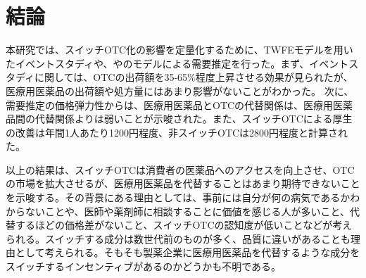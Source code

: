 \documentclass[a4paper,11pt,uplatex]{jsarticle}
\theoremstyle{definition}
\begin{document}
\section{結論}
本研究では、スイッチOTC化の影響を定量化するために、TWFEモデルを用いたイベントスタディや、\cite{Berry1994}や\cite{BLP}のモデルによる需要推定を行った。まず、イベントスタディに関しては、OTCの出荷額を35-65\%程度上昇させる効果が見られたが、医療用医薬品の出荷額や処方量にはあまり影響がないことがわかった。
次に、需要推定の価格弾力性からは、医療用医薬品とOTCの代替関係は、医療用医薬品間の代替関係よりは弱いことが示唆された。また、スイッチOTCによる厚生の改善は年間1人あたり1200円程度、非スイッチOTCは2800円程度と計算された。

以上の結果は、スイッチOTCは消費者の医薬品へのアクセスを向上させ、OTCの市場を拡大させるが、医療用医薬品を代替することはあまり期待できないことを示唆する。その背景にある理由としては、事前には自分が何の病気であるかわからないことや、医師や薬剤師に相談することに価値を感じる人が多いこと、代替するほどの価格差がないこと、スイッチOTCの認知度が低いことなどが考えられる。スイッチする成分は数世代前のものが多く、品質に違いがあることも理由として考えられる。そもそも製薬企業に医療用医薬品を代替するような成分をスイッチするインセンティブがあるのかどうかも不明である。
\end{document}
